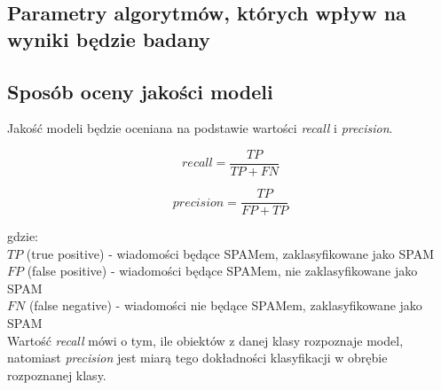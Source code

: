 \documentclass[a4paper, 10pt]{article}
\begin{document}

\subsection{Parametry algorytmów, których wpływ na wyniki będzie badany}


\subsection{Sposób oceny jakości modeli}

Jakość modeli będzie oceniana na podstawie wartości \textit{recall} i \textit{precision}.

\begin{equation}
recall = \frac{TP}{TP + FN}
\end{equation}

\begin{equation}
precision = \frac{TP}{FP + TP}
\end{equation}

gdzie:\\
$TP$ (true positive) - wiadomości będące SPAMem, zaklasyfikowane jako SPAM\\
$FP$ (false positive) - wiadomości będące SPAMem, nie zaklasyfikowane jako SPAM\\
$FN$ (false negative) - wiadomości nie będące SPAMem, zaklasyfikowane jako SPAM\\

Wartość \textit{recall} mówi o tym, ile obiektów z danej klasy rozpoznaje model, natomiast \textit{precision} jest miarą tego dokładności klasyfikacji w obrębie rozpoznanej klasy.

\nocite{*}

\end{document}
